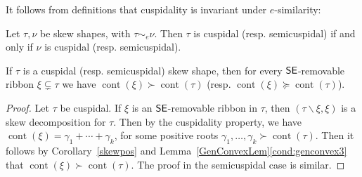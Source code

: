 \documentclass[Unicode,ALCO]{cedram}
\newcommand{\0}{{\bar 0}}
\newcommand{\ssee}{{\sf SE}}
\def\cont{{\operatorname{cont}}}
\begin{document}
It follows from definitions that cuspidality is invariant under \(e\)-similarity: 
\begin{lemma}
Let \(\tau, \nu\) be skew shapes, with \(\tau \sim_e \nu\). Then \(\tau\) is cuspidal (resp. semicuspidal) if and only if \(\nu\) is cuspidal (resp. semicuspidal). 
\end{lemma}


\begin{lemma}\label{shapehooktest}
If \(\tau\) is a cuspidal (resp. semicuspidal) skew shape, then for every \(\ssee\)-removable ribbon \(\xi \subsetneq \tau\) we have \(\cont(\xi) \succ \cont(\tau)\) (resp. \(\cont(\xi) \succeq \cont(\tau)\)).
\end{lemma}
\begin{proof}
 Let \(\tau\) be cuspidal. If \(\xi\) is an \(\ssee\)-removable ribbon in \(\tau\), then \((\tau \backslash \xi, \xi)\) is a skew decomposition for \(\tau\). 
 Then by the cuspidality property, we have \(\cont(\xi) = \gamma_1 + \cdots + \gamma_k\), for some positive roots \(\gamma_1, \ldots, \gamma_k \succ \cont(\tau)\). Then it follows by Corollary~\ref{skewpos} and Lemma~\ref{GenConvexLem}\eqref{cond:genconvex3} that \(\cont(\xi) \succ \cont(\tau)\). The proof in the semicuspidal case is similar.
\end{proof}
\end{document}
